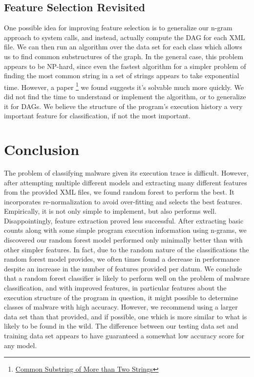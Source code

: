 \documentclass[letterpaper]{article}
\begin{document}
\subsection{Feature Selection Revisited}
One possible idea for improving feature selection is to generalize our n-gram approach to system calls, and instead, actually compute the DAG for each XML file. We can then run an algorithm over the data set for each class which allows us to find common substructures of the graph. In the general case, this problem appears to be NP-hard, since even the fastest algorithm for a simpler problem of finding the most common string in a set of strings appears to take exponential time. However, a paper \footnote{\href{http://web.cs.ucdavis.edu/~gusfield/cs224f11/commonsubstrings.pdf}{Common Substring of More than Two Strings}} we found suggests it's solvable much more quickly. We did not find the time to understand or implement the algorithm, or to generalize it for DAGs. We believe the structure of the program's execution history a very important feature for classification, if not the most important.

\section{Conclusion}
The problem of classifying malware given its execution trace is difficult. However, after attempting multiple different models and extracting many different features from the provided XML files, we found random forest to perform the best. It incorporates re-normalization to avoid over-fitting and selects the best features. Empirically, it is not only simple to implement, but also performs well. Disappointingly, feature extraction proved less successful. After extracting basic counts along with some simple program execution information using n-grams, we discovered our random forest model performed only minimally better than with other simpler features. In fact, due to the random nature of the classifications the random forest model provides, we often times  found a decrease in performance despite an increase in the number of features provided per datum. We conclude that a random forest classifier is likely to perform well on the problem of malware classification, and with improved features, in particular features about the execution structure of the program in question, it might possible to determine classes of malware with high accuracy. However, we recommend using a larger data set than that provided, and if possible, one which is more similar to what is likely to be  found in the wild. The difference between our testing data set and training data set appears to have guaranteed a somewhat low accuracy score for any model.
\end{document}
